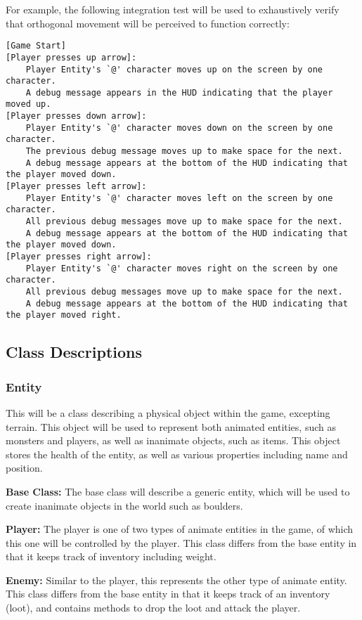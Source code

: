 \documentclass{article}
\begin{document}
For example, the following integration test will be used to exhaustively verify that orthogonal movement will be perceived to function correctly:
\begin{verbatim}
[Game Start]
[Player presses up arrow]:  
    Player Entity's `@' character moves up on the screen by one character.
    A debug message appears in the HUD indicating that the player moved up.
[Player presses down arrow]:
    Player Entity's `@' character moves down on the screen by one character.
    The previous debug message moves up to make space for the next.
    A debug message appears at the bottom of the HUD indicating that the player moved down.
[Player presses left arrow]:
    Player Entity's `@' character moves left on the screen by one character.
    All previous debug messages move up to make space for the next.
    A debug message appears at the bottom of the HUD indicating that the player moved down.
[Player presses right arrow]:
    Player Entity's `@' character moves right on the screen by one character.
    All previous debug messages move up to make space for the next.
    A debug message appears at the bottom of the HUD indicating that the player moved right.
\end{verbatim}
\subsection{Class Descriptions}
\subsubsection{Entity}
This will be a class describing a physical object within the game, excepting terrain. This object will be used to represent both animated entities, such as monsters and players, as well as inanimate objects, such as items. This object stores the health of the entity, as well as various properties including name and position.

\textbf{Base Class:} The base class will describe a generic entity, which will be used to create inanimate objects in the world such as boulders.

\textbf{Player:} The player is one of two types of animate entities in the game, of which this one will be controlled by the player. This class differs from the base entity in that it keeps track of inventory including weight.

\textbf{Enemy:} Similar to the player, this represents the other type of animate entity. This class differs from the base entity in that it keeps track of an inventory (loot), and contains methods to drop the loot and attack the player.
\end{document}
